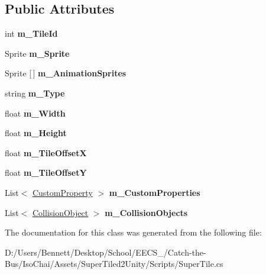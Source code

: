 \subsection*{Public Attributes}
\begin{DoxyCompactItemize}
\item 
\mbox{\label{class_super_tiled2_unity_1_1_super_tile_adee71ac6f2b7d36bb534d4cf6c76ac1e}} 
int {\bfseries m\+\_\+\+Tile\+Id}
\item 
\mbox{\label{class_super_tiled2_unity_1_1_super_tile_a34790a505167d953a3c87e2323d7d81e}} 
Sprite {\bfseries m\+\_\+\+Sprite}
\item 
\mbox{\label{class_super_tiled2_unity_1_1_super_tile_ad9df42d5936de8593c3fa77688b7a8ac}} 
Sprite \mbox{[}$\,$\mbox{]} {\bfseries m\+\_\+\+Animation\+Sprites}
\item 
\mbox{\label{class_super_tiled2_unity_1_1_super_tile_aec19745fff7b039cb6a2e2f749e8dc21}} 
string {\bfseries m\+\_\+\+Type}
\item 
\mbox{\label{class_super_tiled2_unity_1_1_super_tile_a88d1fb82f739d18735f437334547e93b}} 
float {\bfseries m\+\_\+\+Width}
\item 
\mbox{\label{class_super_tiled2_unity_1_1_super_tile_afdf07cd1cff5160de1d675b78f2af9eb}} 
float {\bfseries m\+\_\+\+Height}
\item 
\mbox{\label{class_super_tiled2_unity_1_1_super_tile_ade5b79e475dcf5a66bd2caab0229f9ea}} 
float {\bfseries m\+\_\+\+Tile\+OffsetX}
\item 
\mbox{\label{class_super_tiled2_unity_1_1_super_tile_a06189330e46d9c01c8d10789e06d16f1}} 
float {\bfseries m\+\_\+\+Tile\+OffsetY}
\item 
\mbox{\label{class_super_tiled2_unity_1_1_super_tile_a3e7ad9b2c882a1e7c0bb97467f2bf22e}} 
List$<$ \mbox{\hyperlink{class_super_tiled2_unity_1_1_custom_property}{Custom\+Property}} $>$ {\bfseries m\+\_\+\+Custom\+Properties}
\item 
\mbox{\label{class_super_tiled2_unity_1_1_super_tile_ae3e703e344f98d620e4474796b2efae8}} 
List$<$ \mbox{\hyperlink{class_super_tiled2_unity_1_1_collision_object}{Collision\+Object}} $>$ {\bfseries m\+\_\+\+Collision\+Objects}
\end{DoxyCompactItemize}


The documentation for this class was generated from the following file\+:\begin{DoxyCompactItemize}
\item 
D\+:/\+Users/\+Bennett/\+Desktop/\+School/\+E\+E\+C\+S\+\_/\+Catch-\/the-\/\+Bus/\+Iso\+Chai/\+Assets/\+Super\+Tiled2\+Unity/\+Scripts/Super\+Tile.\+cs\end{DoxyCompactItemize}
